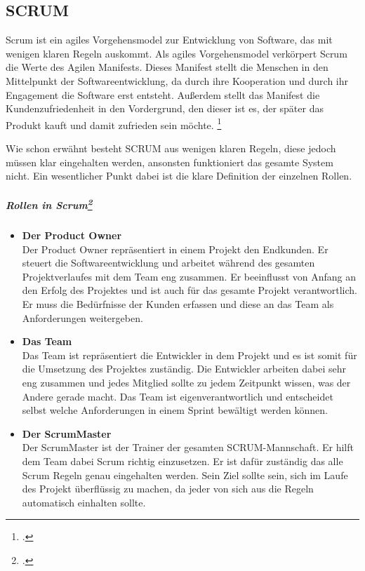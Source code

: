 
\subsection{SCRUM}
Scrum ist ein agiles Vorgehensmodel zur Entwicklung von Software, das mit wenigen klaren Regeln auskommt. Als agiles Vorgehensmodel verkörpert Scrum die Werte des Agilen Manifests.
Dieses Manifest stellt die Menschen in den Mittelpunkt der Softwareentwicklung, da durch ihre Kooperation und durch ihr Engagement die Software erst entsteht. Außerdem stellt das Manifest die Kundenzufriedenheit in den Vordergrund, den dieser ist es, der später das Produkt kauft und damit zufrieden sein möchte. \footcite[vgl.][]{scrum}

Wie schon erwähnt besteht SCRUM aus wenigen klaren Regeln, diese jedoch müssen klar eingehalten werden, ansonsten funktioniert das gesamte System nicht. Ein wesentlicher Punkt dabei ist die klare Definition der einzelnen Rollen.

\subparagraph{Rollen in Scrum\footcite[vgl.][]{scrumroles}}
\begin{itemize}
\item{\textbf{Der Product Owner}}\\
Der Product Owner repräsentiert in einem Projekt den Endkunden. Er steuert die Softwareentwicklung und arbeitet während des gesamten Projektverlaufes mit dem Team eng zusammen. Er beeinflusst von Anfang an den Erfolg des Projektes und ist auch für das gesamte Projekt verantwortlich. Er muss die Bedürfnisse der Kunden erfassen und diese an das Team als Anforderungen weitergeben.
\item{\textbf{Das Team}}\\
Das Team ist repräsentiert die Entwickler in dem Projekt und es ist somit für die Umsetzung des Projektes zuständig. Die Entwickler arbeiten dabei sehr eng zusammen und jedes Mitglied sollte zu jedem Zeitpunkt wissen, was der Andere gerade macht. Das Team ist eigenverantwortlich und entscheidet selbst welche Anforderungen in einem Sprint bewältigt werden können. 
\item{\textbf{Der ScrumMaster}}\\
Der ScrumMaster ist der Trainer der gesamten SCRUM-Mannschaft. Er hilft dem Team dabei Scrum richtig einzusetzen. Er ist dafür zuständig das alle Scrum Regeln genau eingehalten werden. Sein Ziel sollte sein, sich im Laufe des Projekt überflüssig zu machen, da jeder von sich aus die Regeln automatisch einhalten sollte.
 
\end{itemize}

